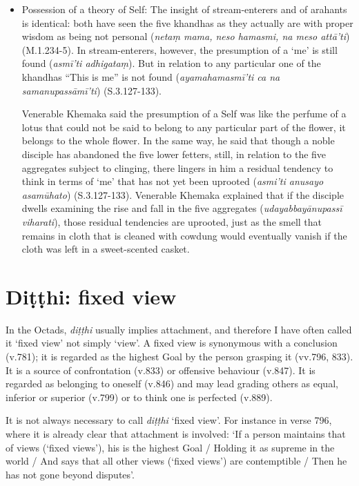 \begin{itemize}
\item Possession of a theory of Self: The insight of stream-enterers and of arahants is identical: both have seen the five khandhas as they actually are with proper wisdom as being not personal (\textit{netaṃ mama, neso hamasmi, na meso attā'ti}) (M.1.234-5). In stream-enterers, however, the presumption of a `me' is still found (\textit{asmī'ti adhigataṃ}). But in relation to any particular one of the khandhas ``This is me'' is not found (\textit{ayamahamasmī'ti ca na samanupassāmī'ti}) (S.3.127-133).

Venerable Khemaka said the presumption of a Self was like the perfume of a lotus that could not be said to belong to any particular part of the flower, it belongs to the whole flower. In the same way, he said that though a noble disciple has abandoned the five lower fetters, still, in relation to the five aggregates subject to clinging, there lingers in him a residual tendency to think in terms of `me' that has not yet been uprooted (\textit{asmi'ti anusayo asamūhato}) (S.3.127-133). Venerable Khemaka explained that if the disciple dwells examining the rise and fall in the five aggregates (\textit{udayabbayānupassī viharati}), those residual tendencies are uprooted, just as the smell that remains in cloth that is cleaned with cowdung would eventually vanish if the cloth was left in a sweet-scented casket.

\end{itemize}

\section*{Di\d{t}\d{t}hi: fixed view}

In the Octads, \textit{diṭṭhi} usually implies attachment, and therefore I have often called it `fixed view' not simply `view'. A fixed view is synonymous with a conclusion (v.781); it is regarded as the highest Goal by the person grasping it (vv.796, 833). It is a source of confrontation (v.833) or offensive behaviour (v.847). It is regarded as belonging to oneself (v.846) and may lead grading others as equal, inferior or superior (v.799) or to think one is perfected (v.889).

It is not always necessary to call \textit{diṭṭhi} `fixed view'. For instance in verse 796, where it is already clear that attachment is involved: `If a person maintains that of views (`fixed views'), his is the highest Goal / Holding it as supreme in the world / And says that all other views (`fixed views') are contemptible / Then he has not gone beyond disputes'.

